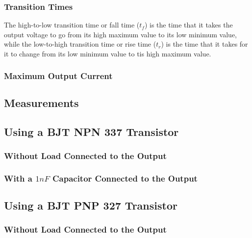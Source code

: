 \documentclass[a4paper,11pt]{report}
\begin{document}
\subsubsection{\color{red}Transition Times}
The high-to-low transition time or fall time ($t_{f}$) is the time that it takes the output voltage to go from its high maximum value to its low minimum value, while the low-to-high transition time or rise time ($t_{r}$) is the time that it takes for it to change from its low minimum value to tis high maximum value.


\subsubsection{\color{red}Maximum Output Current}

\subsection{\color{purple}Measurements}


\subsection{\color{purple}Using a BJT NPN 337 Transistor}

\subsubsection{\color{red}Without Load Connected to the Output}

\subsubsection{\color{red}With a $1 nF$ Capacitor Connected to the Output}


\subsection{\color{purple}Using a BJT PNP 327 Transistor}

\subsubsection{\color{red}Without Load Connected to the Output}
\end{document}
